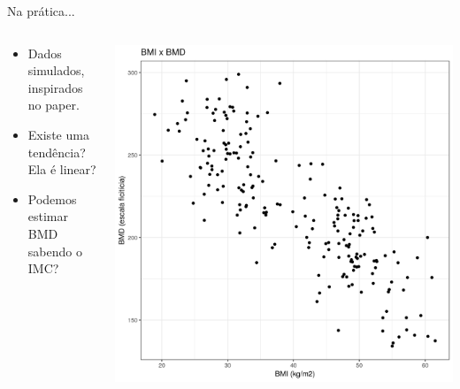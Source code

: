 \documentclass{beamer}
\begin{document}
\begin{frame}{\scriptsize Na prática...}
  \begin{columns}
    \begin{column}{5cm}
      \begin{itemize}
      \item Dados simulados, inspirados no paper.
      \item Existe uma tendência? Ela é linear?
      \item Podemos estimar BMD sabendo o IMC?
      \end{itemize}
    \end{column}
    \begin{column}{5cm}
      \begin{center}
        \includegraphics[width=\textwidth]{Cap18-19/pratica-rls1}
      \end{center}
    \end{column}
  \end{columns}
\end{frame}
\end{document}
